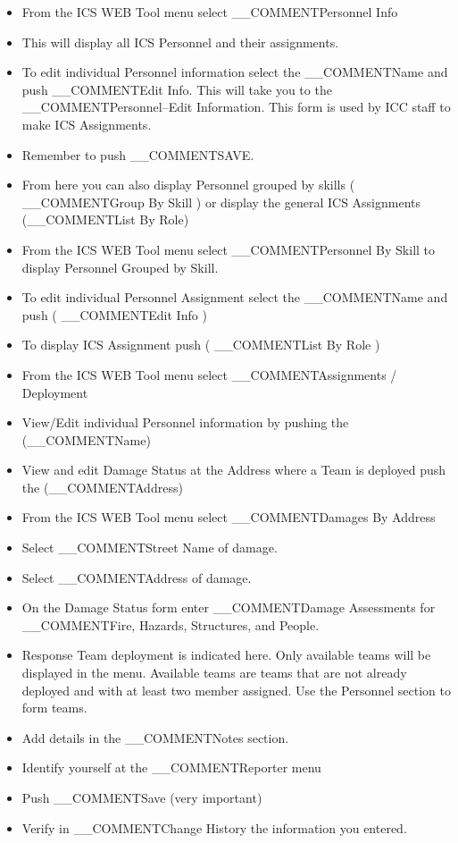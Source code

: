 \begin{itemize}
\item From the ICS WEB Tool menu 
select __COMMENT{Personnel Info} 
\item This will display all ICS Personnel and their assignments.
\item To edit individual Personnel information select the 
__COMMENT{Name} and push __COMMENT{Edit Info}.
This will take you to the 
__COMMENT{Personnel--Edit Information}.
This form is used by ICC staff to make ICS Assignments.
\item Remember to push __COMMENT{SAVE}.
\item From here you can also display Personnel grouped by skills 
( __COMMENT{Group By Skill} ) 
or
display the general ICS Assignments (__COMMENT{List By Role})
\end{itemize}

\begin{itemize}
\item From the ICS WEB Tool menu 
select __COMMENT{Personnel By Skill} 
to display Personnel Grouped by Skill.
\item To edit individual Personnel Assignment select the __COMMENT{Name} and 
push ( __COMMENT{Edit Info} )
\item To display ICS Assignment 
push ( __COMMENT{List By Role } )
\end{itemize}

\begin{itemize}
\item From the ICS WEB Tool menu 
select __COMMENT{Assignments / Deployment} 
\item View/Edit individual Personnel information by pushing the (__COMMENT{Name})
\item View and edit Damage Status at the Address where a Team is deployed 
push the (__COMMENT{Address})
\end{itemize}

\begin{itemize}
\item From the ICS WEB Tool menu select __COMMENT{Damages By Address}
\item Select __COMMENT{Street Name} of damage.
\item Select __COMMENT{Address} of damage.
\item On the Damage Status form 
enter 
__COMMENT{Damage Assessments} for __COMMENT{Fire, Hazards, Structures, and People}.
\item Response Team deployment is indicated here.  
Only available teams will be displayed in the menu.
Available teams are teams that are not already deployed 
and with at least two member assigned.
Use the Personnel section to form teams.
\item Add details in the __COMMENT{Notes} section.
\item Identify yourself at the __COMMENT{Reporter} menu 
\item Push __COMMENT{Save} (very important)
\item Verify in __COMMENT{Change History} the information you entered.
\end{itemize}

